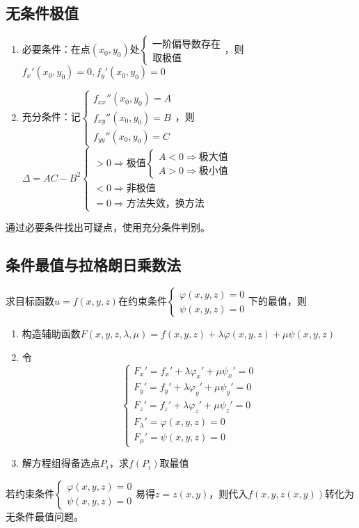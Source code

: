 \subsection{无条件极值}
\begin{enumerate}
    \item 必要条件：在点\((x_0, y_0)\)处\(\begin{cases}
        \text{一阶偏导数存在} \\ 
        \text{取极值}
    \end{cases}\)，则\(f_x'(x_0, y_0) = 0, f_y'(x_0, y_0) = 0\)
    \item 充分条件：记\(\begin{cases}
        f_{xx}''(x_0, y_0) = A \\ 
        f_{xy}''(x_0, y_0) = B \\ 
        f_{yy}''(x_0, y_0) = C
    \end{cases}\)，则\(\Delta = AC - B^2\begin{cases}
        > 0 \Rightarrow \text{极值}\begin{cases}
            A < 0 \Rightarrow \text{极大值} \\ 
            A > 0 \Rightarrow \text{极小值}
        \end{cases} \\ 
        < 0 \Rightarrow \text{非极值} \\ 
        = 0 \Rightarrow \text{方法失效，换方法}
    \end{cases}\)
\end{enumerate}
通过必要条件找出可疑点，使用充分条件判别。


\subsection{条件最值与拉格朗日乘数法}
求目标函数\(u = f(x, y, z)\)在约束条件\(\begin{cases}
    \varphi(x, y, z) = 0 \\ 
    \psi(x, y, z) = 0
\end{cases}\)下的最值，则\begin{enumerate}
    \item 构造辅助函数\(F(x, y, z, \lambda, \mu) = f(x, y, z) + \lambda\varphi(x, y, z) + \mu\psi(x, y, z)\)
    \item 令\[\begin{cases}
        F_x' = f_x' + \lambda\varphi_x' + \mu\psi_x' = 0 \\ 
        F_y' = f_y' + \lambda\varphi_y' + \mu\psi_y' = 0 \\ 
        F_z' = f_z' + \lambda\varphi_z' + \mu\psi_z' = 0 \\ 
        F_\lambda' = \varphi(x, y, z) = 0 \\ 
        F_\mu' = \psi(x, y, z) = 0
    \end{cases}\]
    \item 解方程组得备选点\(P_i\)，求\(f(P_i)\)取最值
\end{enumerate}
若约束条件\(\begin{cases}
    \varphi(x, y, z) = 0 \\ 
    \psi(x, y, z) = 0
\end{cases}\)易得\(z = z(x, y)\)，则代入\(f(x, y, z(x, y))\)转化为无条件最值问题。


